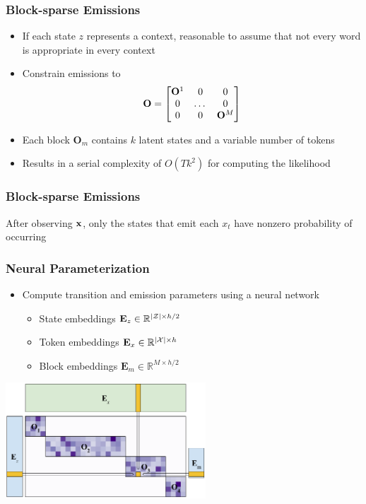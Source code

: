 \documentclass{beamer}
\begin{document}
\begin{frame}
\frametitle{Block-sparse Emissions}
\begin{itemize}
\item If each state $z$ represents a context, reasonable to assume that not every word
    is appropriate in every context
\item Constrain emissions to
\[\mathbf{O} = \begin{bmatrix} \mathbf{O}^1 & 0 & 0 \\ 0 & $\dots$ & 0 \\ 0 & 0 & \mathbf{O}^M \\
\end{bmatrix}\]
\item Each block $\mathbf{O}_m$ contains $k$ latent states and a variable number of tokens
\item Results in a serial complexity of $O(Tk^2)$ for computing the likelihood
\end{itemize}
\end{frame}

\begin{frame}
\frametitle{Block-sparse Emissions}
\begin{center}
\resizebox{2in}{2in}{

}
\end{center}

After observing $\mathbf{x}$, only the states that emit each $x_t$ have nonzero probability
of occurring
\end{frame}

\begin{frame}
\frametitle{Neural Parameterization}

\begin{itemize}
\item Compute transition and emission parameters using a neural network
\begin{itemize}
\item State embeddings $\mathbf{E}_z \in \mathbb{R}^{|\mathcal{Z}| \times h/2}$
\item Token embeddings $\mathbf{E}_x \in \mathbb{R}^{|\mathcal{X}| \times h}$
\item Block embeddings $\mathbf{E}_m \in \mathbb{R}^{M \times h/2}$
\end{itemize}
\end{itemize}

\vspace{0.5em}

\centering
\includegraphics[height=1.7in]{img/mat.png}

\end{frame}
\end{document}
